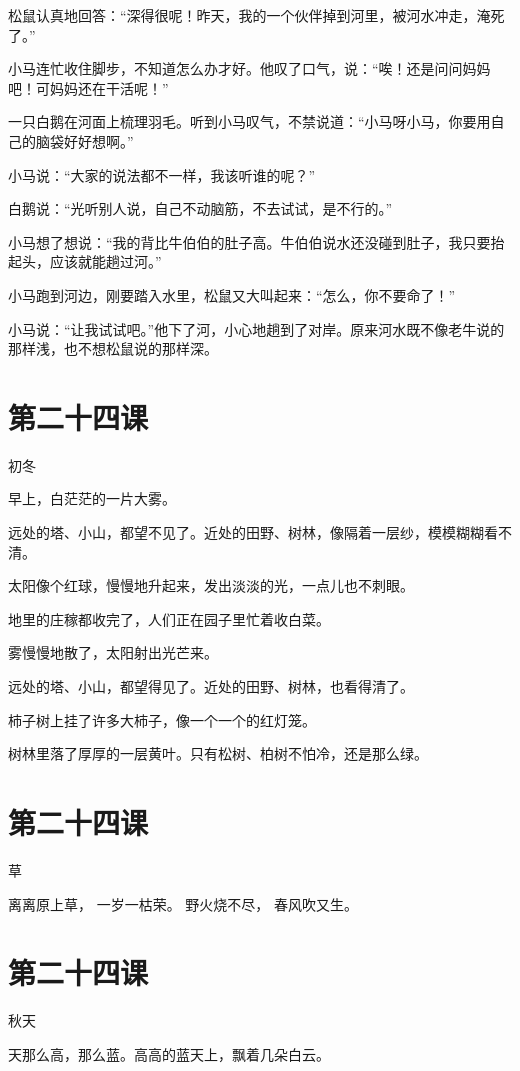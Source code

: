 \documentclass[12pt,UTF8]{ctexbook}
\begin{document}
松鼠认真地回答：“深得很呢！昨天，我的一个伙伴掉到河里，被河水冲走，淹死了。”

小马连忙收住脚步，不知道怎么办才好。他叹了口气，说：“唉！还是问问妈妈吧！可妈妈还在干活呢！”

一只白鹅在河面上梳理羽毛。听到小马叹气，不禁说道：“小马呀小马，你要用自己的脑袋好好想啊。”

小马说：“大家的说法都不一样，我该听谁的呢？”

白鹅说：“光听别人说，自己不动脑筋，不去试试，是不行的。”

小马想了想说：“我的背比牛伯伯的肚子高。牛伯伯说水还没碰到肚子，我只要抬起头，应该就能趟过河。”

小马跑到河边，刚要踏入水里，松鼠又大叫起来：“怎么，你不要命了！”

小马说：“让我试试吧。”他下了河，小心地趟到了对岸。原来河水既不像老牛说的那样浅，也不想松鼠说的那样深。

\section{第二十四课}

初冬

早上，白茫茫的一片大雾。

远处的塔、小山，都望不见了。近处的田野、树林，像隔着一层纱，模模糊糊看不清。

太阳像个红球，慢慢地升起来，发出淡淡的光，一点儿也不刺眼。

地里的庄稼都收完了，人们正在园子里忙着收白菜。

雾慢慢地散了，太阳射出光芒来。

远处的塔、小山，都望得见了。近处的田野、树林，也看得清了。

柿子树上挂了许多大柿子，像一个一个的红灯笼。

树林里落了厚厚的一层黄叶。只有松树、柏树不怕冷，还是那么绿。

\section{第二十四课}

草

离离原上草，
一岁一枯荣。
野火烧不尽，
春风吹又生。

\section{第二十四课}

秋天

天那么高，那么蓝。高高的蓝天上，飘着几朵白云。
\end{document}
